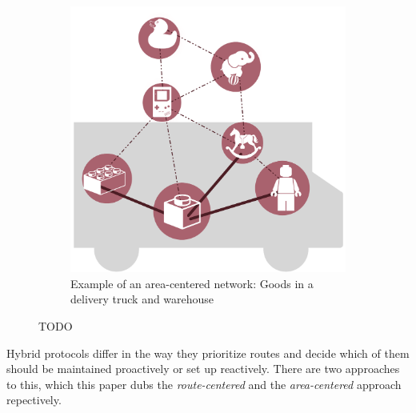 \documentclass[a4paper,10pt]{scrartcl}
\begin{document}
\begin{figure}
\begin{subfigure}[b]{0.5\textwidth}
                \includegraphics[width=\textwidth]{../images/area_centered_example}
                \caption{Example of an area-centered network: Goods in a delivery truck and warehouse}
                \label{fig:ac_img}
        \end{subfigure}
        \caption{TODO}\label{fig:scope}
\end{figure}

Hybrid protocols differ in the way they prioritize routes and decide which of them should be maintained proactively or set up reactively. There are two approaches to this, which this paper dubs the \emph{route-centered} and the \emph{area-centered} approach repectively.\\
\end{document}
